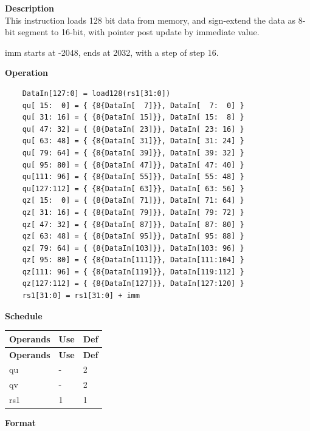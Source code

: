 \textbf{Description}\\
This instruction loads 128 bit data from memory, and sign-extend the data as 8-bit segment to 16-bit, with pointer post update by immediate value.

imm starts at -2048, ends at 2032, with a step of step 16.

\textbf{Operation}\\
\begin{lstlisting}
    DataIn[127:0] = load128(rs1[31:0])
    qu[ 15:  0] = { {8{DataIn[  7]}}, DataIn[  7:  0] }
    qu[ 31: 16] = { {8{DataIn[ 15]}}, DataIn[ 15:  8] }
    qu[ 47: 32] = { {8{DataIn[ 23]}}, DataIn[ 23: 16] }
    qu[ 63: 48] = { {8{DataIn[ 31]}}, DataIn[ 31: 24] }
    qu[ 79: 64] = { {8{DataIn[ 39]}}, DataIn[ 39: 32] }
    qu[ 95: 80] = { {8{DataIn[ 47]}}, DataIn[ 47: 40] }
    qu[111: 96] = { {8{DataIn[ 55]}}, DataIn[ 55: 48] }
    qu[127:112] = { {8{DataIn[ 63]}}, DataIn[ 63: 56] }
    qz[ 15:  0] = { {8{DataIn[ 71]}}, DataIn[ 71: 64] }
    qz[ 31: 16] = { {8{DataIn[ 79]}}, DataIn[ 79: 72] }
    qz[ 47: 32] = { {8{DataIn[ 87]}}, DataIn[ 87: 80] }
    qz[ 63: 48] = { {8{DataIn[ 95]}}, DataIn[ 95: 88] }
    qz[ 79: 64] = { {8{DataIn[103]}}, DataIn[103: 96] }
    qz[ 95: 80] = { {8{DataIn[111]}}, DataIn[111:104] }
    qz[111: 96] = { {8{DataIn[119]}}, DataIn[119:112] }
    qz[127:112] = { {8{DataIn[127]}}, DataIn[127:120] }
    rs1[31:0] = rs1[31:0] + imm
\end{lstlisting}

\textbf{Schedule}\\
\begin{longtable}[c]{|l|l|l|}
    \hline
    \rowcolor{lightgray}
    \textbf{Operands} & \textbf{Use} & \textbf{Def} \\\hline
    \endfirsthead
    \hline
    \rowcolor{lightgray}
     \textbf{Operands} & \textbf{Use} & \textbf{Def} \\\hline
    \endhead
    \hline
    \endfoot

  qu & - & 2 \\\hline
  qv & - & 2 \\\hline
  rs1 & 1 & 1

\end{longtable}

\textbf{Format}\\

